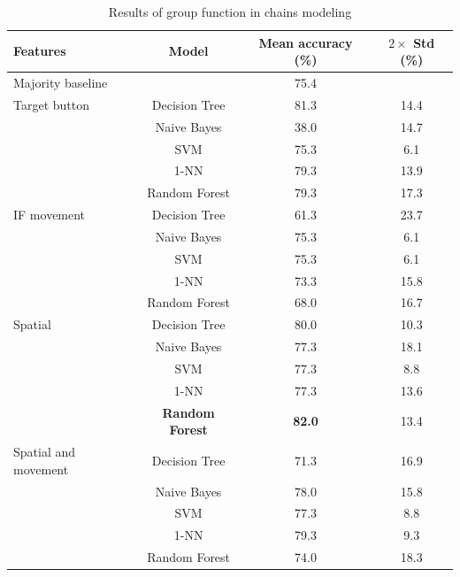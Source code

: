 \begin{table}[!htbp]
 \centering
\begin{tabular}{lccc}
\toprule
Features & Model    & Mean accuracy (\%) & $2\times$ Std (\%) \\
\midrule
Majority baseline &   & 75.4	& \\
\midrule
Target button 	& Decision Tree 	& 81.3		& 14.4 	\\
				& Naive Bayes  	& 38.0		& 14.7	\\
				& SVM 			& 75.3		& 6.1 	\\
				& 1-NN			& 79.3		& 13.9 	\\
				& Random Forest	& 79.3		& 17.3	\\
\midrule
IF movement	& Decision Tree 	& 	61.3	& 23.7 \\
			& Naive Bayes  	&	75.3	& 6.1	\\
			& SVM 			&	75.3	& 6.1 	\\
			& 1-NN			&	73.3	 & 15.8 	\\
			& Random Forest	&	68.0	& 16.7 	\\
\midrule
Spatial	 	& Decision Tree 	& 80.0	& 10.3 \\
			& Naive Bayes  	& 77.3 	& 18.1	\\
			& SVM 			& 77.3	& 8.8 	\\
			& 1-NN			& 77.3	& 13.6 \\
			& \textbf{Random Forest}	& \textbf{82.0}	& 13.4 \\	

\midrule
Spatial and movement& Decision Tree 	& 71.3	& 16.9 \\
					& Naive Bayes  	& 78.0	& 15.8	\\
					& SVM 			& 77.3	& 8.8 	\\
					& 1-NN			& 79.3	& 9.3 \\
					& Random Forest	& 74.0	& 18.3 \\	 	
\bottomrule
\end{tabular}
\caption{Results of group function in chains modeling}
\label{tab:chains-ml-group}
\end{table}

